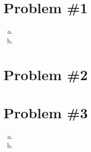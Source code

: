 \documentclass[11pt]{article}
\numberwithin{equation}{section}
\begin{document}


\section{Problem \#1}
\begin{enumerate}[(a)]
\item
\item
\end{enumerate}

\pagebreak

\section{Problem \#2}

\pagebreak

\section{Problem \#3}
\begin{enumerate}[(a)]
\item
\item
\end{enumerate}

\pagebreak
\end{document}
